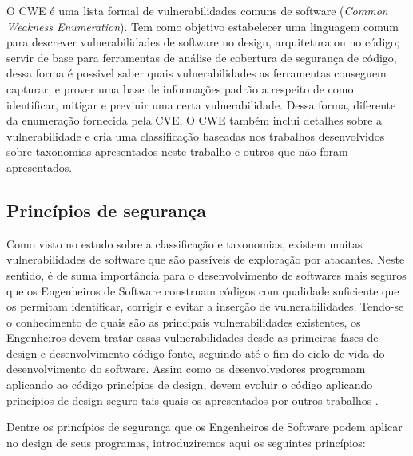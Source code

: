 %
O CWE é uma lista formal de vulnerabilidades comuns de software (\emph{Common Weakness Enumeration}). Tem como objetivo estabelecer uma linguagem comum para descrever vulnerabilidades de software no design, arquitetura ou no código; servir de base para ferramentas de análise de cobertura de segurança de código, dessa forma é possivel saber quais vulnerabilidades as ferramentas conseguem capturar; e prover uma base de informações padrão a respeito de como identificar, mitigar e previnir uma certa vulnerabilidade. Dessa forma, diferente da enumeração fornecida pela CVE, O CWE também inclui detalhes sobre a vulnerabilidade e cria uma classificação baseadas nos trabalhos desenvolvidos sobre taxonomias apresentados neste trabalho e outros que não foram apresentados.
%

\subsection{Princípios de segurança}
\label{sec-security-principles}

Como visto no estudo sobre a classificação e taxonomias, existem muitas vulnerabilidades de software que são passíveis de exploração por atacantes. Neste sentido, é de suma importância para o desenvolvimento de softwares mais seguros que os Engenheiros de Software construam códigos com qualidade suficiente que os permitam identificar, corrigir e evitar a inserção de vulnerabilidades. Tendo-se o conhecimento de quais são as principais vulnerabilidades existentes, os Engenheiros devem tratar essas vulnerabilidades desde as primeiras fases de design e desenvolvimento código-fonte, seguindo até o fim do ciclo de vida do desenvolvimento do software. Assim como os desenvolvedores programam aplicando ao código princípios de design, devem evoluir o código aplicando princípios de design seguro tais quais os apresentados por outros trabalhos \cite{saltzer1975} \cite{bishop2003} \cite{mcgraw2002} \cite{a1lshammari2009}.

%

Dentre os princípios de segurança que os Engenheiros de Software podem aplicar no design de seus programas, introduziremos aqui os seguintes princípios:


